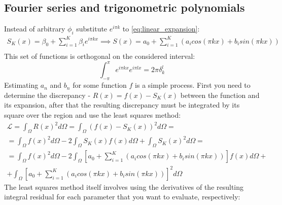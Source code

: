 \subsection{Fourier series and trigonometric polynomials}
Instead of arbitrary $\phi_i$ substitute $e^{i \pi k}$ to \eqref{eq:linear_expansion}:
\begin{equation*}
	\begin{multlined}
		S_K(x) = \beta_0 + \sum_{i = 1}^K \beta_i e^{i \pi k x} \implies S(x) = a_0 + \sum_{i = 1}^K \left (a_i cos(\pi k x) + b_i sin(\pi k x) \right ) \\
	\end{multlined}
\end{equation*}
This set of functions is orthogonal on the considered interval:
\begin{equation*} 
	\int_{-\pi}^{\pi} e^{i \pi k x} e^{i \pi l x} = 2\pi \delta_k^l 
\end{equation*}
Estimating $ a_n $ and $ b_n $ for some function $ f $ is a simple process. First you need to determine the discrepancy - $ R (x) = f (x) - S_K (x) $ between the function and its expansion, after that the resulting discrepancy must be integrated by its square over the region and use the least squares method:
\begin{equation*}
	\begin{multlined}
		\mathcal{L} = \int_{\Omega} R(x)^2 d\Omega = \int_{\Omega} \left ( f(x) - S_K(x) \right )^2 d\Omega = \\ = \int_{\Omega} f(x)^2 d\Omega - 2 \int_{\Omega} S_K(x) f(x) d\Omega + \int_{\Omega} S_K(x)^2 d\Omega = \\ = \int_{\Omega} f(x)^2 d\Omega - 2 \int_{\Omega} \left [ a_0 + \sum_{i = 1}^K \left (a_i cos(\pi k x) + b_i sin(\pi k x) \right ) \right ] f(x) d\Omega + \\ +  \int_{\Omega} \left [ a_0 + \sum_{i = 1}^K \left (a_i cos(\pi k x) + b_i sin(\pi k x) \right ) \right ]^2 d\Omega
	\end{multlined}
\end{equation*}
The least squares method itself involves using the derivatives of the resulting integral residual for each parameter that you want to evaluate, respectively:

